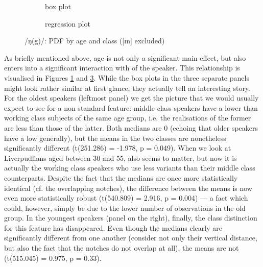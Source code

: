 \begin{figure}[h]
	\centering
	\begin{subfigure}{.49\textwidth}
		\centering
			\resizebox{\linewidth}{!}{} 
		\caption{box plot}
		\label{fig.box.ng.ageclass}
	\end{subfigure}
	\begin{subfigure}{.49\textwidth}
		\centering
			\resizebox{\linewidth}{!}{}
		\caption{regression plot}
		\label{fig.scatter.ng.ageclass}
	\end{subfigure}
	\caption{/ŋ(g)/: PDF by age and class ([ɪn] excluded)}
\end{figure}

As briefly mentioned above, age is not only a significant main effect, but also enters into a significant interaction with  of the speaker.
This relationship is visualised in Figures \ref{fig.box.ng.ageclass} and \ref{fig.scatter.ng.ageclass}.
While the box plots in the three separate panels might look rather similar at first glance, they actually tell an interesting story.
For the oldest speakers (leftmost panel) we get the picture that we would usually expect to see for a non-standard feature: middle class speakers have a lower  than working class subjects of the same age group, i.e. the realisations of the former are less  than those of the latter.
Both medians are 0 (echoing that older speakers have a low  generally), but the means in the two classes are nonetheless significantly different (t(251.286) = -1.978, p = 0.049).
When we look at Liverpudlians aged between 30 and 55,  also seems to matter, but now it is actually the working class speakers who use less  variants than their middle class counterparts.
Despite the fact that the medians are once more statistically identical (cf. the overlapping notches), the difference between the means is now even more statistically robust (t(540.809) = 2.916, p = 0.004) --- a fact which could, however, simply be due to the lower number of observations in the old group.
In the youngest speakers (panel on the right), finally, the class distinction for this feature has disappeared.
Even though the medians clearly are significantly different from one another (consider not only their vertical distance, but also the fact that the notches do not overlap at all), the means are not (t(515.045) = 0.975, p = 0.33).

